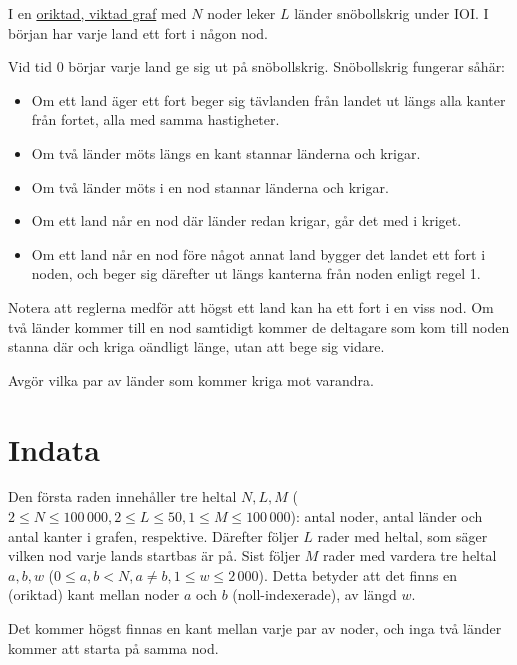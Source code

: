 I en \href{https://sv.wikipedia.org/wiki/Graf_(grafteori)}{oriktad, viktad graf}
med $N$ noder leker $L$ länder snöbollskrig under IOI.
I början har varje land ett fort i någon nod.

Vid tid $0$ börjar varje land ge sig ut på snöbollskrig. Snöbollskrig fungerar såhär:

\begin{itemize}
\item Om ett land äger ett fort beger sig tävlanden från landet ut längs alla kanter från fortet, alla med samma hastigheter.
\item Om två länder möts längs en kant stannar länderna och krigar.
\item Om två länder möts i en nod stannar länderna och krigar.
\item Om ett land når en nod där länder redan krigar, går det med i kriget.
\item Om ett land når en nod före något annat land bygger det landet ett fort i noden, och beger sig därefter ut längs kanterna från noden enligt regel 1.
\end{itemize}

Notera att reglerna medför att högst ett land kan ha ett fort i en viss nod.
Om två länder kommer till en nod samtidigt kommer de deltagare som kom till noden stanna där och kriga oändligt länge, utan att bege sig vidare.

Avgör vilka par av länder som kommer kriga mot varandra.

\section*{Indata}

Den första raden innehåller tre heltal $N,L,M$ ($2 \le N \le 100\,000, 2 \le L \le 50, 1 \le M \le 100\,000$):
antal noder, antal länder och antal kanter i grafen, respektive.
Därefter följer $L$ rader med heltal, som säger vilken nod varje lands startbas är på.
Sist följer $M$ rader med vardera tre heltal $a, b, w$ ($0 \le a,b < N, a \neq b, 1 \le w \le 2\,000$).
Detta betyder att det finns en (oriktad) kant mellan noder $a$ och $b$ (noll-indexerade), av längd $w$.

Det kommer högst finnas en kant mellan varje par av noder, och inga två länder kommer att starta på samma nod.

